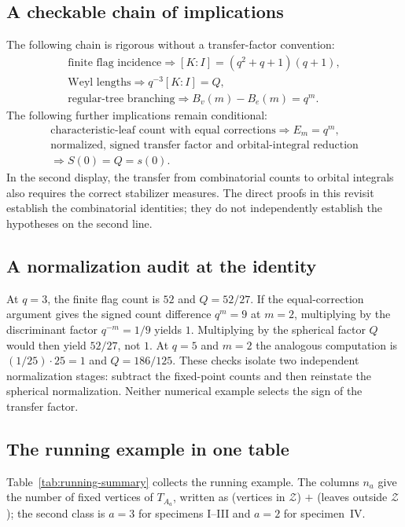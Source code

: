 \documentclass[12pt,letterpaper]{amsart}
\numberwithin{equation}{section}
\theoremstyle{definition}
\theoremstyle{plain}
\begin{document}
\subsection{A checkable chain of implications}
The following chain is rigorous without a transfer-factor convention:
\[
\begin{gathered}
\text{finite flag incidence}
 \Longrightarrow [K:I]=(q^2+q+1)(q+1),\\
\text{Weyl lengths}
 \Longrightarrow q^{-3}[K:I]=Q,\\
\text{regular-tree branching}
 \Longrightarrow B_v(m)-B_e(m)=q^m.
\end{gathered}
\]
The following further implications remain conditional:
\[
\begin{gathered}
\text{characteristic-leaf count with equal corrections}
 \Longrightarrow E_m=q^m,\\
\text{normalized, signed transfer factor and orbital-integral
 reduction}\\
\Longrightarrow S(0)=Q=s(0).
\end{gathered}
\]
In the second display, the transfer from combinatorial counts to
orbital integrals also requires the correct stabilizer measures.
The direct proofs in this revisit establish the combinatorial
identities; they do not independently establish the hypotheses
on the second line.

\subsection{A normalization audit at the identity}
At $q=3$, the finite flag count is $52$ and $Q=52/27$.
If the equal-correction argument gives the signed count difference
$q^m=9$ at $m=2$, multiplying by the discriminant factor
$q^{-m}=1/9$ yields $1$. Multiplying by the spherical factor
$Q$ would then yield $52/27$, not $1$.
At $q=5$ and $m=2$ the analogous computation is
$(1/25)\cdot25=1$ and $Q=186/125$.
These checks isolate two independent normalization stages:
subtract the fixed-point counts and then reinstate the spherical
normalization. Neither numerical example selects the sign of
the transfer factor.

\subsection{The running example in one table}
\label{sec:new-running-summary}

Table~\ref{tab:running-summary} collects the running example. The
columns $n_a$ give the number of fixed vertices of $T_{A_a}$, written
as (vertices in $\mathcal Z$) $+$ (leaves outside $\mathcal Z$); the
second class is $a=3$ for specimens I--III and $a=2$ for specimen~IV.
\end{document}
